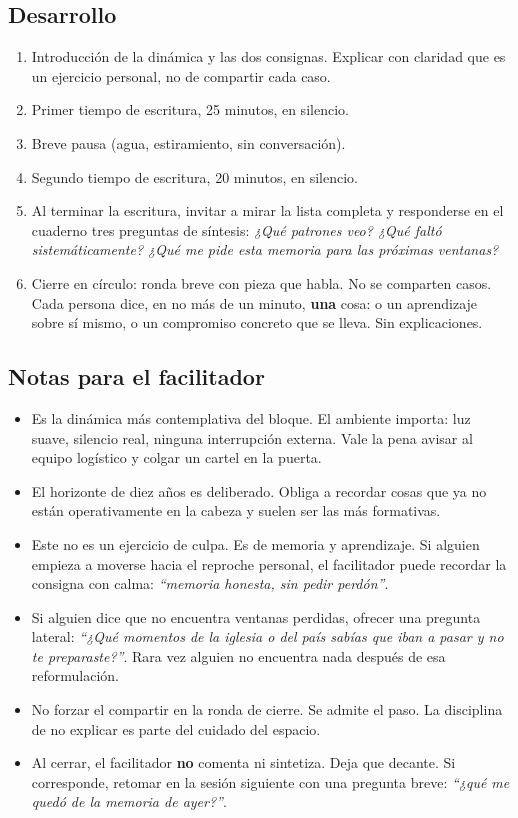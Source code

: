 \documentclass[11pt, a4paper]{article}
\begin{document}
\begin{actividad}
\subsection*{Desarrollo}
\begin{enumerate}[label={\arabic*.}]
  \item Introducción de la dinámica y las dos consignas. Explicar con claridad que es un ejercicio personal, no de compartir cada caso.
  \item Primer tiempo de escritura, 25 minutos, en silencio.
  \item Breve pausa (agua, estiramiento, sin conversación).
  \item Segundo tiempo de escritura, 20 minutos, en silencio.
  \item Al terminar la escritura, invitar a mirar la lista completa y responderse en el cuaderno tres preguntas de síntesis: \emph{¿Qué patrones veo? ¿Qué faltó sistemáticamente? ¿Qué me pide esta memoria para las próximas ventanas?}
  \item Cierre en círculo: ronda breve con pieza que habla. No se comparten casos. Cada persona dice, en no más de un minuto, \textbf{una} cosa: o un aprendizaje sobre sí mismo, o un compromiso concreto que se lleva. Sin explicaciones.
\end{enumerate}

\subsection*{Notas para el facilitador}
\begin{itemize}
  \item Es la dinámica más contemplativa del bloque. El ambiente importa: luz suave, silencio real, ninguna interrupción externa. Vale la pena avisar al equipo logístico y colgar un cartel en la puerta.
  \item El horizonte de diez años es deliberado. Obliga a recordar cosas que ya no están operativamente en la cabeza y suelen ser las más formativas.
  \item Este no es un ejercicio de culpa. Es de memoria y aprendizaje. Si alguien empieza a moverse hacia el reproche personal, el facilitador puede recordar la consigna con calma: \emph{``memoria honesta, sin pedir perdón''}.
  \item Si alguien dice que no encuentra ventanas perdidas, ofrecer una pregunta lateral: \emph{``¿Qué momentos de la iglesia o del país sabías que iban a pasar y no te preparaste?''}. Rara vez alguien no encuentra nada después de esa reformulación.
  \item No forzar el compartir en la ronda de cierre. Se admite el paso. La disciplina de no explicar es parte del cuidado del espacio.
  \item Al cerrar, el facilitador \textbf{no} comenta ni sintetiza. Deja que decante. Si corresponde, retomar en la sesión siguiente con una pregunta breve: \emph{``¿qué me quedó de la memoria de ayer?''}.
\end{itemize}

\end{actividad}
\end{document}
